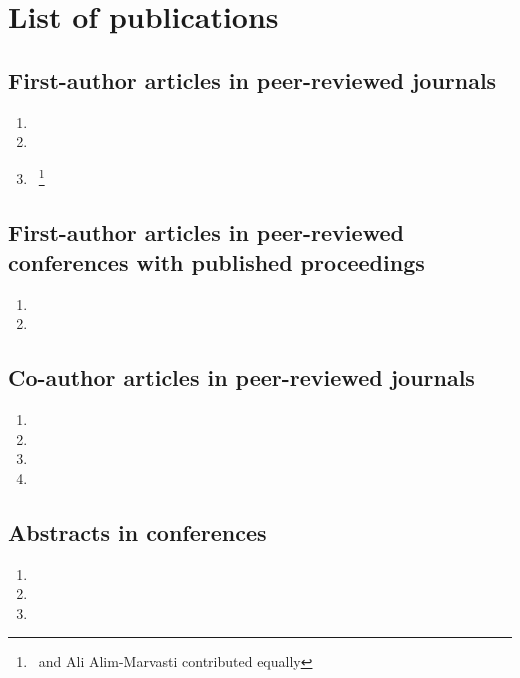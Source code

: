 \chapter{List of publications}

\section*{First-author articles in peer-reviewed journals} %
\label{sec:first_author_journal_articles}
\begin{enumerate}
  \item {}
  \item {}
  \item {}~\footnote{\theauthor\ and Ali Alim-Marvasti contributed equally}
\end{enumerate}

\section*{First-author articles in peer-reviewed conferences with published proceedings}
\label{sec:first_author_peer_reviewed_conference_papers}
\begin{enumerate}
  \item {\sloppy {}}
  \item {}
\end{enumerate}

\section*{Co-author articles in peer-reviewed journals} %
\label{sec:journal_articles}
\begin{enumerate}
  \item {}
  \item {}
  \item {}
  \item {}
\end{enumerate}

\section*{Abstracts in conferences} %
\label{sec:abstracts}
\begin{enumerate}
  \item {}
  \item {}
  \item {}
\end{enumerate}

